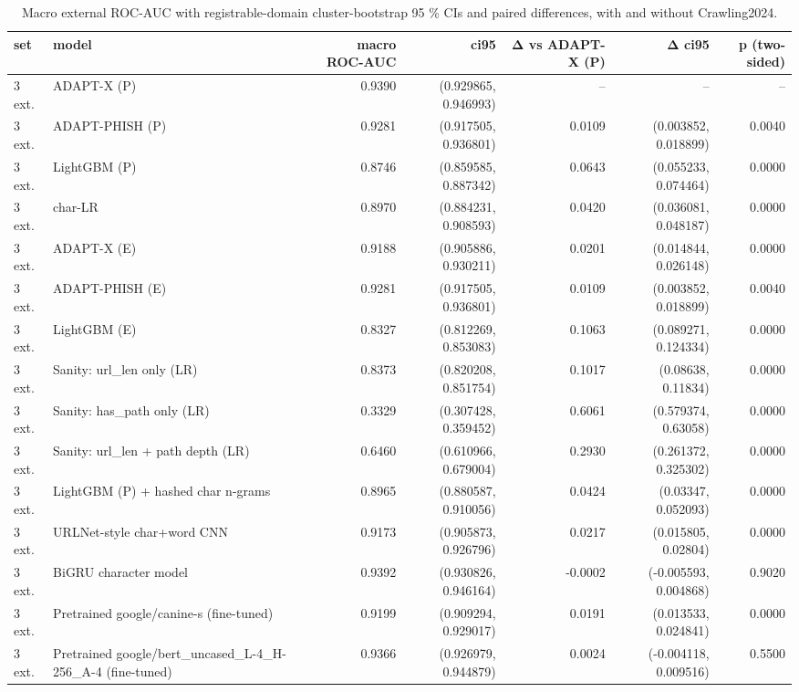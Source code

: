 \begin{table}[t]
\centering
\scriptsize
\caption{Macro external ROC-AUC with registrable-domain cluster-bootstrap 95 \% CIs and paired differences, with and without Crawling2024.}
\label{tab:rev_R3_macro_auc_bootstrap_with_without_crawling2024}
\begin{tabular}{llrrrrr}
\toprule
set & model & macro ROC-AUC & ci95 & Δ vs ADAPT-X (P) & Δ ci95 & p (two-sided) \\
\midrule
3 ext. & ADAPT-X (P) & 0.9390 & (0.929865, 0.946993) & -- & -- & -- \\
3 ext. & ADAPT-PHISH (P) & 0.9281 & (0.917505, 0.936801) & 0.0109 & (0.003852, 0.018899) & 0.0040 \\
3 ext. & LightGBM (P) & 0.8746 & (0.859585, 0.887342) & 0.0643 & (0.055233, 0.074464) & 0.0000 \\
3 ext. & char-LR & 0.8970 & (0.884231, 0.908593) & 0.0420 & (0.036081, 0.048187) & 0.0000 \\
3 ext. & ADAPT-X (E) & 0.9188 & (0.905886, 0.930211) & 0.0201 & (0.014844, 0.026148) & 0.0000 \\
3 ext. & ADAPT-PHISH (E) & 0.9281 & (0.917505, 0.936801) & 0.0109 & (0.003852, 0.018899) & 0.0040 \\
3 ext. & LightGBM (E) & 0.8327 & (0.812269, 0.853083) & 0.1063 & (0.089271, 0.124334) & 0.0000 \\
3 ext. & Sanity: url\_len only (LR) & 0.8373 & (0.820208, 0.851754) & 0.1017 & (0.08638, 0.11834) & 0.0000 \\
3 ext. & Sanity: has\_path only (LR) & 0.3329 & (0.307428, 0.359452) & 0.6061 & (0.579374, 0.63058) & 0.0000 \\
3 ext. & Sanity: url\_len + path depth (LR) & 0.6460 & (0.610966, 0.679004) & 0.2930 & (0.261372, 0.325302) & 0.0000 \\
3 ext. & LightGBM (P) + hashed char n-grams & 0.8965 & (0.880587, 0.910056) & 0.0424 & (0.03347, 0.052093) & 0.0000 \\
3 ext. & URLNet-style char+word CNN & 0.9173 & (0.905873, 0.926796) & 0.0217 & (0.015805, 0.02804) & 0.0000 \\
3 ext. & BiGRU character model & 0.9392 & (0.930826, 0.946164) & -0.0002 & (-0.005593, 0.004868) & 0.9020 \\
3 ext. & Pretrained google/canine-s (fine-tuned) & 0.9199 & (0.909294, 0.929017) & 0.0191 & (0.013533, 0.024841) & 0.0000 \\
3 ext. & Pretrained google/bert\_uncased\_L-4\_H-256\_A-4 (fine-tuned) & 0.9366 & (0.926979, 0.944879) & 0.0024 & (-0.004118, 0.009516) & 0.5500 \\

\end{tabular}
\end{table}
